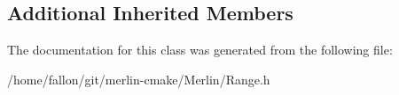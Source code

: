\subsection*{Additional Inherited Members}


The documentation for this class was generated from the following file\+:\begin{DoxyCompactItemize}
\item 
/home/fallon/git/merlin-\/cmake/\+Merlin/Range.\+h\end{DoxyCompactItemize}
